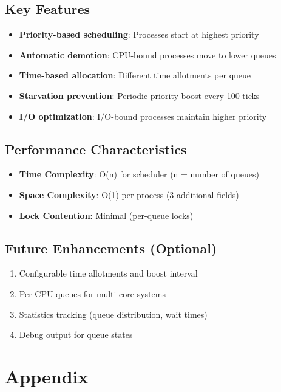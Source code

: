 \documentclass[11pt,a4paper]{article}
\begin{document}
\subsection{Key Features}

\begin{itemize}
    \item \textbf{Priority-based scheduling}: Processes start at highest priority
    \item \textbf{Automatic demotion}: CPU-bound processes move to lower queues
    \item \textbf{Time-based allocation}: Different time allotments per queue
    \item \textbf{Starvation prevention}: Periodic priority boost every 100 ticks
    \item \textbf{I/O optimization}: I/O-bound processes maintain higher priority
\end{itemize}

\subsection{Performance Characteristics}

\begin{itemize}
    \item \textbf{Time Complexity}: O(n) for scheduler (n = number of queues)
    \item \textbf{Space Complexity}: O(1) per process (3 additional fields)
    \item \textbf{Lock Contention}: Minimal (per-queue locks)
\end{itemize}

\subsection{Future Enhancements (Optional)}

\begin{enumerate}
    \item Configurable time allotments and boost interval
    \item Per-CPU queues for multi-core systems
    \item Statistics tracking (queue distribution, wait times)
    \item Debug output for queue states
\end{enumerate}

\section{Appendix}
\end{document}
